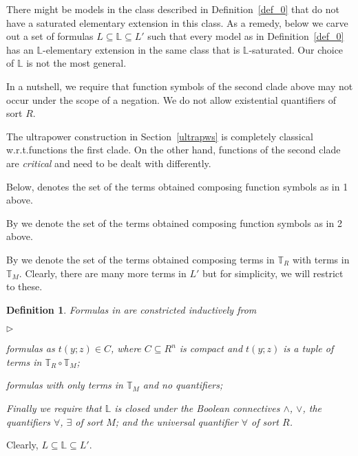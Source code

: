 \documentclass[12pt,letterpaper,oneside,reqno]{amsart}
\newcommand{\mylabel}[1]{{#1}\hfill}
\renewenvironment{itemize}
  {\begin{list}{$\triangleright$}{%
   \setlength{\parskip}{0mm}
   \setlength{\topsep}{.2\baselineskip}
   \setlength{\rightmargin}{0mm}
   \setlength{\listparindent}{0mm}
   \setlength{\itemindent}{0mm}
   \setlength{\labelwidth}{3ex}
   \setlength{\itemsep}{.2\baselineskip}
   \setlength{\parsep}{.2\baselineskip}
   \setlength{\partopsep}{0mm}
   \setlength{\labelsep}{1ex}
   \setlength{\leftmargin}{\labelwidth+\labelsep}
   \let\makelabel\mylabel}}{%
   \end{list}}
\theoremstyle{plain}
\newtheorem{definition}[theorem]{Definition}
\theoremstyle{remark}
\renewcommand*{\emph}[1]{%
   \smash{\tikz[baseline]\node[rectangle, fill=olive!25, rounded corners, inner xsep=0.5ex, inner ysep=0.2ex, anchor=base, minimum height = 2.7ex]{#1};}}
\begin{document}
  
There might be models in  the class described in Definition~\ref{def_0} that do not have a saturated elementary extension in this class.
As a remedy, below we carve out a set of formulas $L\subseteq\mathds{L}\subseteq L'$ such that every model as in Definition~\ref{def_0} has an $\mathds{L}$-elementary extension in the same class that is $\mathds{L}$-saturated.
Our choice of $\mathds{L}$ is not the most general.

In a nutshell, we require that function symbols of the second clade above may not occur under the scope of a negation.
We do not allow existential quantifiers of sort $R$.

The ultrapower construction in Section~\ref{ultrapws} is completely classical w.r.t.\@ functions the first clade. 
On the other hand, functions of the second clade are \textit{critical\/} and need to be dealt with differently.
 
Below, \emph{$\mathds{T}_M$\/} denotes the set of the terms obtained composing function symbols as in 1 above.

By \emph{$\mathds{T}_R$\/} we denote the set of the terms obtained composing function symbols as in 2 above.

By \emph{$\mathds{T}_R\circ\mathds{T}_M$\/} we  denote the set of the terms obtained composing terms in $\mathds{T}_R$ with terms in $\mathds{T}_M$. 
Clearly, there are many more terms in $L'$ but for simplicity, we will restrict to these.

\begin{definition}\label{def_1}
  Formulas in \emph{$\mathds{L}$\/} are constricted inductively from 
  \begin{itemize}
  \item[i.] formulas as $t(y;z)\in C$, where $C\subseteq R^n$ is compact and $t(y;z)$ is a tuple of terms in $\mathds{T}_R\circ\mathds{T}_M$; 
  \item[ii.] formulas with only terms in $\mathds{T}_M$ and no quantifiers;
  \end{itemize}
  Finally we require that $\mathds{L}$ is closed under the Boolean connectives $\wedge$, $\vee$, the quantifiers $\forall$, $\exists$ of sort $M$; and the universal quantifier $\forall$ of sort $R$.
\end{definition}

Clearly, $L\subseteq\mathds{L}\subseteq L'$.
\end{document}
